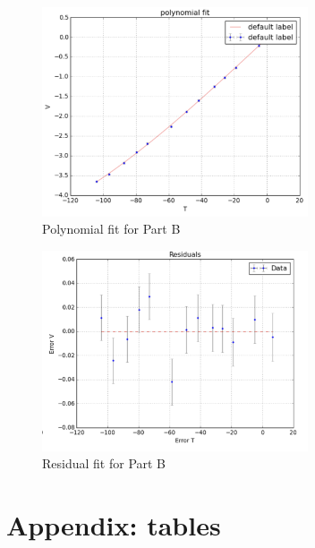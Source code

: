 \documentclass[12pt,a4paper]{report}
\begin{document}
\begin{figure}[H]
    \centering
    \includegraphics[width=0.7\textwidth]{Part B results/polynomial-fit.png}
    \caption{Polynomial fit for Part B}
    \label{fig:appendix_partB_polynomial_fit}
\end{figure}

\begin{figure}[H]
    \centering
    \includegraphics[width=0.7\textwidth]{Part B results/polynomial residual.png}
    \caption{Residual fit for Part B}
    \label{fig:appendix_partB_residual_fit}
\end{figure}

\pagebreak

\section{Appendix: tables}
\end{document}
